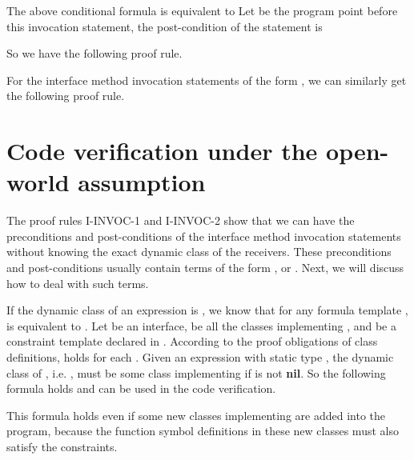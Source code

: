 \documentclass[fleqn]{llncs}
\begin{document}
The above conditional formula is equivalent to 
Let  be the program point before this invocation statement, the post-condition of the statement  is

So we have the following proof rule.

For the interface method invocation statements of the form , we can similarly get the following proof rule.


\section{Code verification under the open-world assumption}\label{SEC-OPEN-WORLD}
The proof rules I-INVOC-1 and I-INVOC-2 show that we can have the preconditions and post-conditions of the interface method invocation statements without
knowing the exact dynamic class of the receivers. These preconditions and post-conditions usually contain terms of the form , or
.
Next, we will discuss how to deal with such terms.

If the dynamic class of an expression  is , we know that for any formula template ,  is equivalent
to .
Let  be an interface,  be all the classes implementing , and  be a constraint template declared in .
According to the proof obligations of class definitions,  holds for each . Given an expression  with static type ,
the dynamic class of , i.e. , must be some class implementing  if  is not \textbf{nil}. So the following formula holds and can be used in
the code verification.

This formula holds even if some new classes implementing  are added into the program, because the function symbol definitions in these new classes must also satisfy
the constraints.
\end{document}
